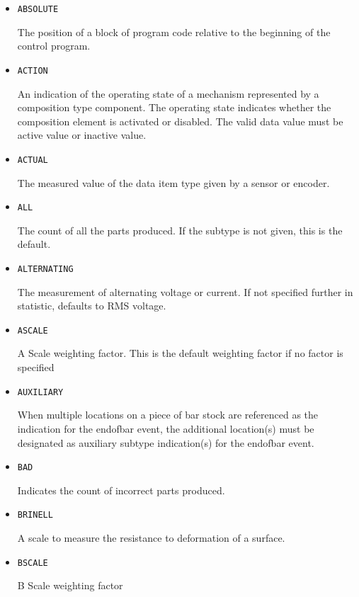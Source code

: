 \begin{itemize}


\item \texttt{ABSOLUTE}  

The position of a block of program code relative to the beginning of the control program.


\item \texttt{ACTION}  

An indication of the operating state of a mechanism represented by a composition type component.
 The operating state indicates whether the composition element is activated or disabled. 
 The valid data value must be active value or inactive value.


\item \texttt{ACTUAL}  

The measured value of the data item type given by a sensor or encoder.


\item \texttt{ALL}  

The count of all the parts produced.  If the subtype is not given, this is the default.


\item \texttt{ALTERNATING}  

The measurement of alternating voltage or current.   If not specified further in statistic, defaults to RMS voltage. 


\item \texttt{A\textunderscore SCALE}  

A Scale weighting factor.   This is the default weighting factor if no factor is specified


\item \texttt{AUXILIARY}  

When multiple locations on a piece of bar stock are referenced as the indication for the endofbar event, the additional location(s) must be designated as auxiliary subtype indication(s) for the endofbar event.  


\item \texttt{BAD}  

Indicates the count of incorrect parts produced.


\item \texttt{BRINELL}  

A scale to measure the resistance to deformation of a surface.


\item \texttt{B\textunderscore SCALE}  

B Scale weighting factor



\end{itemize}
